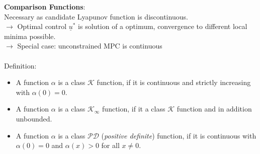 \documentclass[english]{latex4ei/latex4ei_sheet}
\begin{document}
\begin{sectionbox}
\textbf{Comparison Functions}:\\
Necessary as candidate Lyapunov function is discontinuous.\\ 
$\rightarrow$ Optimal control $\underline{u}^{*}$ is solution of a optimum, convergence to different local minima possible.\\
$\rightarrow$ Special case: unconstrained MPC is continuous\\
\\
Definition:
\begin{itemize}
    \item A function $\alpha$ is a class $\mathcal{K}$ function, if it is continuous and strictly increasing with $\alpha(0)=0$.
    \item A function $\alpha$ is a class $\mathcal{K}_{\infty}$ function, if it a class $\mathcal{K}$ function and in addition unbounded.
    \item A function $\alpha$ is a class $\mathcal{PD}$ (\textit{positive definite}) function, if it is continuous with $\alpha(0)=0$ and $\alpha(x)>0$ for all $x\neq0$.
\end{itemize}

\end{sectionbox}
\end{document}
